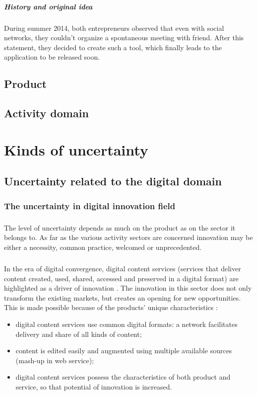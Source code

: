 \documentclass[twoside]{report}
\begin{document}
\paragraph{History and original idea}
During summer 2014, both entrepreneurs observed that even with social networks, they couldn't organize a spontaneous meeting with friend. After this statement, they decided to create such a tool, which finally leads to the application to be released soon.
\section{Product}
\section{Activity domain}







\chapter{Kinds of uncertainty}
\section{Uncertainty related to the digital domain}
\subsection{The uncertainty in digital innovation field}
\paragraph{}
The level of uncertainty depends as much on the product as on the sector it belongs to. As far as the various activity sectors are concerned innovation may be either a necessity, common practice, welcomed or unprecedented.
\paragraph{}
In the era of digital convergence, digital content services (services that deliver content created, used, shared, accessed and preserved in a digital format) are highlighted as a driver of innovation \cite{toivonen_innovation_2007, gwee_innovation_2009}. The innovation in this sector does not only transform the existing markets, but creates an opening for new opportunities. This is made possible because of the products' unique characteristics \cite{kim_patterns_2012}:
\begin{itemize}
\item digital content services use common digital formats: a network facilitates delivery and share of all kinds of content;
\item content is edited easily and augmented using multiple available sources (mash-up in web service);
\item digital content services possess the characteristics of both product and service, so that potential of innovation is increased.
\end{itemize}
\end{document}
